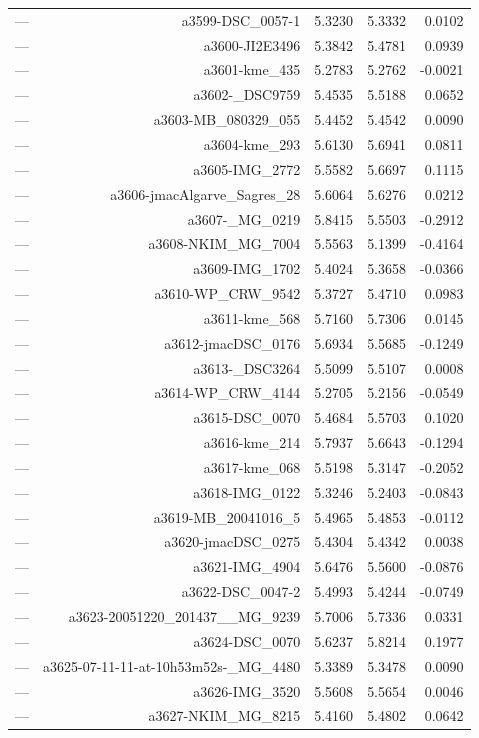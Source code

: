 \begin{table}[htbp]
\begin{tabular}{lrrrr}
— & a3599-DSC_0057-1 & 5.3230 & 5.3332 & 0.0102 \\
— & a3600-JI2E3496 & 5.3842 & 5.4781 & 0.0939 \\
— & a3601-kme_435 & 5.2783 & 5.2762 & -0.0021 \\
— & a3602-_DSC9759 & 5.4535 & 5.5188 & 0.0652 \\
— & a3603-MB_080329_055 & 5.4452 & 5.4542 & 0.0090 \\
— & a3604-kme_293 & 5.6130 & 5.6941 & 0.0811 \\
— & a3605-IMG_2772 & 5.5582 & 5.6697 & 0.1115 \\
— & a3606-jmacAlgarve_Sagres_28 & 5.6064 & 5.6276 & 0.0212 \\
— & a3607-_MG_0219 & 5.8415 & 5.5503 & -0.2912 \\
— & a3608-NKIM_MG_7004 & 5.5563 & 5.1399 & -0.4164 \\
— & a3609-IMG_1702 & 5.4024 & 5.3658 & -0.0366 \\
— & a3610-WP_CRW_9542 & 5.3727 & 5.4710 & 0.0983 \\
— & a3611-kme_568 & 5.7160 & 5.7306 & 0.0145 \\
— & a3612-jmacDSC_0176 & 5.6934 & 5.5685 & -0.1249 \\
— & a3613-_DSC3264 & 5.5099 & 5.5107 & 0.0008 \\
— & a3614-WP_CRW_4144 & 5.2705 & 5.2156 & -0.0549 \\
— & a3615-DSC_0070 & 5.4684 & 5.5703 & 0.1020 \\
— & a3616-kme_214 & 5.7937 & 5.6643 & -0.1294 \\
— & a3617-kme_068 & 5.5198 & 5.3147 & -0.2052 \\
— & a3618-IMG_0122 & 5.3246 & 5.2403 & -0.0843 \\
— & a3619-MB_20041016_5 & 5.4965 & 5.4853 & -0.0112 \\
— & a3620-jmacDSC_0275 & 5.4304 & 5.4342 & 0.0038 \\
— & a3621-IMG_4904 & 5.6476 & 5.5600 & -0.0876 \\
— & a3622-DSC_0047-2 & 5.4993 & 5.4244 & -0.0749 \\
— & a3623-20051220_201437__MG_9239 & 5.7006 & 5.7336 & 0.0331 \\
— & a3624-DSC_0070 & 5.6237 & 5.8214 & 0.1977 \\
— & a3625-07-11-11-at-10h53m52s-_MG_4480 & 5.3389 & 5.3478 & 0.0090 \\
— & a3626-IMG_3520 & 5.5608 & 5.5654 & 0.0046 \\
— & a3627-NKIM_MG_8215 & 5.4160 & 5.4802 & 0.0642 \\

\end{tabular}
\end{table}
